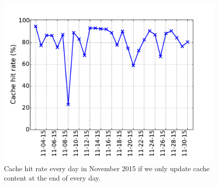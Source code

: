 \begin{figure}[!htb]
   \includegraphics[width=\linewidth]{figure/LRU_day}
{
Cache hit rate every day in November 2015 if we only update cache content at the end of every day.
}
\endminipage\hfill

\vspace{-0.1in}
\end{figure}




